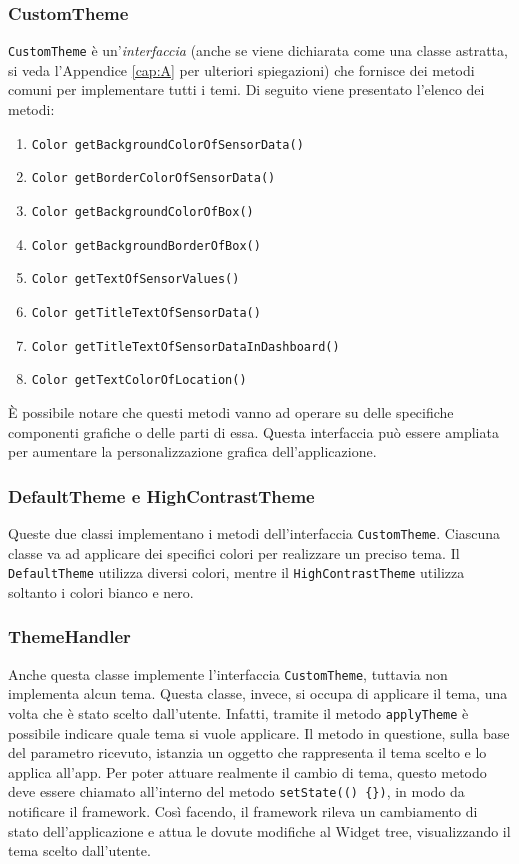 \subsubsection{CustomTheme}
\verb|CustomTheme| è un'\textit{interfaccia} (anche se viene dichiarata come una classe astratta, si veda l'Appendice \ref{cap:A} per ulteriori spiegazioni) che fornisce dei metodi comuni per implementare tutti i temi. Di seguito viene presentato l'elenco dei metodi:
\begin{enumerate}
	\item \verb|Color getBackgroundColorOfSensorData()|
	\item \verb|Color getBorderColorOfSensorData()|
	\item \verb|Color getBackgroundColorOfBox()|
	\item \verb|Color getBackgroundBorderOfBox()|
	\item \verb|Color getTextOfSensorValues()|
	\item \verb|Color getTitleTextOfSensorData()|
	\item \verb|Color getTitleTextOfSensorDataInDashboard()|
	\item \verb|Color getTextColorOfLocation()|
\end{enumerate}
È possibile notare che questi metodi vanno ad operare su delle specifiche componenti grafiche o delle parti di essa. Questa interfaccia può essere ampliata per aumentare la personalizzazione grafica dell'applicazione.

\subsubsection{DefaultTheme e HighContrastTheme}
Queste due classi implementano i metodi dell'interfaccia \verb|CustomTheme|. Ciascuna classe va ad applicare dei specifici colori per realizzare un preciso tema. Il \verb|DefaultTheme| utilizza diversi colori, mentre il \verb|HighContrastTheme| utilizza soltanto i colori bianco e nero.

\subsubsection{ThemeHandler}
Anche questa classe implemente l'interfaccia \verb|CustomTheme|, tuttavia non implementa alcun tema. Questa classe, invece, si occupa di applicare il tema, una volta che è stato scelto dall'utente. Infatti, tramite il metodo \verb|applyTheme| è possibile indicare quale tema si vuole applicare. Il metodo in questione, sulla base del parametro ricevuto, istanzia un oggetto che rappresenta il tema scelto e lo applica all'app. Per poter attuare realmente il cambio di tema, questo metodo deve essere chiamato all'interno del metodo \verb|setState(() {})|, in modo da notificare il framework. Così facendo, il framework rileva un cambiamento di stato dell'applicazione e attua le dovute modifiche al Widget tree, visualizzando il tema scelto dall'utente.

